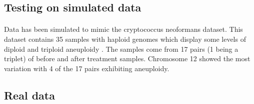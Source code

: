 \documentclass[11pt]{article}
\begin{document}
\subsection{Testing on simulated data}
\paragraph{} Data has been simulated to mimic the cryptococcus neoformans dataset. This dataset contains 35 samples with haploid genomes which display some levels of diploid and triploid aneuploidy \autocite{Rhodes2017}. The samples come from 17 pairs (1 being a triplet) of before and after treatment samples. Chromosome 12 showed the most variation with 4 of the 17 pairs exhibiting aneuploidy. 

\subsection{Real data}
\end{document}
